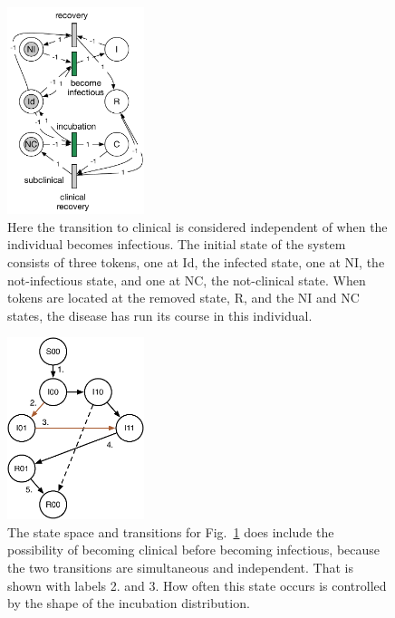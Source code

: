\documentclass{article}
\begin{document}
\begin{figure}
\centerline{\includegraphics[width=4cm]{individual_indep_gspn}}
\caption{Here the transition to clinical is considered independent
of when the individual becomes infectious. The initial state of the
system consists of three tokens, one at Id, the infected state,
one at NI, the not-infectious state, and one at NC, the not-clinical
state. When tokens are located at the removed state, R, and the NI
and NC states, the disease has run its course in this individual.
\label{fig:individual_indep_gspn}}
\end{figure}
\begin{figure}
\centerline{\includegraphics[width=4cm]{state_space_independent}}
\caption{The state space and transitions for Fig.~\ref{fig:individual_indep_gspn}
does include the possibility of becoming clinical before
becoming infectious, because the two transitions are simultaneous
and independent. That is shown with labels 2. and 3.
How often this state occurs is controlled by the shape
of the incubation distribution.\label{fig:state_space_independent}}
\end{figure}
\end{document}
